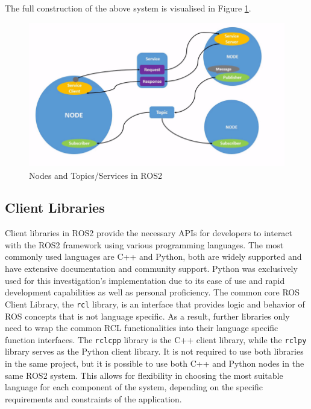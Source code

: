 \documentclass[10pt,a4paper,english]{article}
\begin{document}
The full construction of the above system is visualised in Figure \ref{fig:nodes_topics_services}.
\begin{figure}[ht]
    \centering
    \includegraphics[width=1.0\textwidth]{Nodes_Topics_Services.png}
    \caption{Nodes and Topics/Services in ROS2}
    \label{fig:nodes_topics_services}
\end{figure}

\subsection{Client Libraries}
Client libraries in ROS2 provide the necessary APIs for developers to interact with the ROS2 framework using various programming languages. The most commonly used languages are C++ and Python, both are widely supported and have extensive documentation and community support. Python was exclusively used for this investigation's implementation due to its ease of use and rapid development capabilities as well as personal proficiency.
The common core ROS Client Library, the \texttt{rcl} library, is an interface that provides logic and behavior of ROS concepts that is not language specific. As a result, further libraries only need to wrap the common RCL functionalities into their language specific function interfaces. The \texttt{rclcpp} library is the C++ client library, while the \texttt{rclpy} library serves as the Python client library. It is not required to use both libraries in the same project, but it is possible to use both C++ and Python nodes in the same ROS2 system. This allows for flexibility in choosing the most suitable language for each component of the system, depending on the specific requirements and constraints of the application.
\end{document}
